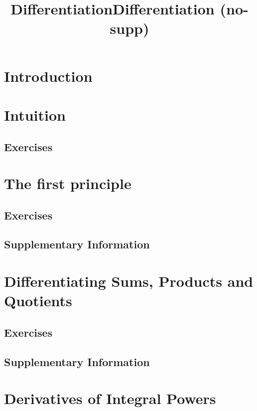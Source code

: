 \documentclass{fts_m2}
\title{Differentiation}
\title{Differentiation (no-supp)}
\begin{document}
    \maketitle
    \section*{Introduction}
    
    \tableofcontents

    \section{Intuition}
    
    \subsection*{Exercises}
      
    
    \section{The first principle}
    
    \subsection*{Exercises}
    
    \ifcompilesupp
    \subsection*{Supplementary Information}
    
    \fi

    \section{Differentiating Sums, Products and Quotients}
    
    \subsection*{Exercises}
    
    \ifcompilesupp
    \subsection*{Supplementary Information}
    
    \fi

    \section{Derivatives of Integral Powers}
    
    \ifcompilesupp
\end{document}
